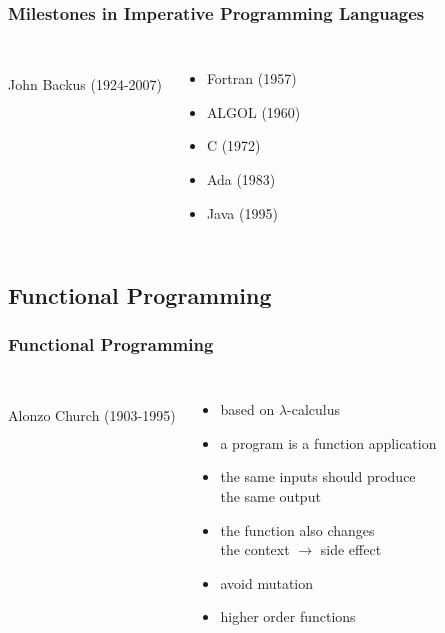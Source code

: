 \documentclass[dvipsnames]{beamer}
\theoremstyle{plain}
\begin{document}
\begin{frame}
  \frametitle{Milestones in Imperative Programming Languages}

  \begin{columns}
    \begin{center}
      \\
      John Backus (1924-2007)
    \end{center}

    \begin{itemize}
      \item Fortran (1957)
      \item ALGOL (1960)
      \item C (1972)
      \item Ada (1983)
      \item Java (1995)
    \end{itemize}
  \end{columns}
\end{frame}

\subsection{Functional Programming}

\begin{frame}
  \frametitle{Functional Programming}

  \begin{columns}
    \begin{center}
      \\
      Alonzo Church (1903-1995)
    \end{center}

    \begin{itemize}
      \item based on $\lambda$-calculus
      \item a program is a function application
      \item the same inputs should produce\\
        the same output

      \pause
      \medskip
      \item the function also changes\\
        the context $\rightarrow$ \alert{side effect}
      \item avoid mutation

      \pause
      \medskip
      \item higher order functions
    \end{itemize}
  \end{columns}
\end{frame}
\end{document}
